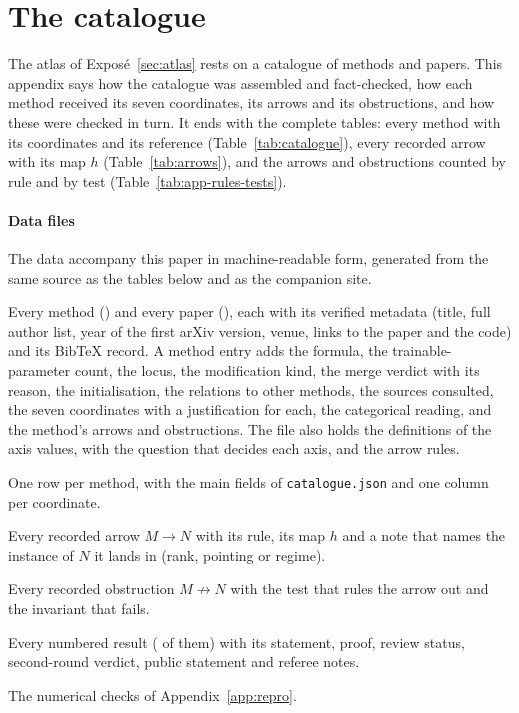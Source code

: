 \section{The catalogue}\label{app:catalogue}

The atlas of Exposé~\ref{sec:atlas} rests on a catalogue of \nMethods{} methods and \nPapers{} papers. This appendix
says how the catalogue was assembled and fact-checked, how each method received its seven coordinates, its arrows and
its obstructions, and how these were checked in turn. It ends with the complete tables: every method with its
coordinates and its reference (Table~\ref{tab:catalogue}), every recorded arrow with its map $h$
(Table~\ref{tab:arrows}), and the arrows and obstructions counted by rule and by test
(Table~\ref{tab:app-rules-tests}).

\paragraph{Data files} The data accompany this paper in machine-readable form, generated from the same source as the tables
below and as the companion site.
\begin{description}[leftmargin=1.2em,itemsep=2pt]
  \item[\texttt{catalogue.json}] Every method (\nMethods{}) and every paper (\nPapers{}), each with its verified
  metadata (title, full author list, year of the first arXiv version, venue, links to the paper and the code) and its
  BibTeX record. A method entry adds the formula, the trainable-parameter count, the locus, the modification kind, the
  merge verdict with its reason, the initialisation, the relations to other methods, the sources consulted, the seven
  coordinates with a justification for each, the categorical reading, and the method's arrows and obstructions. The
  file also holds the definitions of the axis values, with the question that decides each axis, and the arrow rules.
  \item[\texttt{catalogue.csv}] One row per method, with the main fields of \texttt{catalogue.json} and one column per
  coordinate.
  \item[\texttt{arrows.csv}] Every recorded arrow $M\to N$ with its rule, its map $h$ and a note that names the instance
  of $N$ it lands in (rank, pointing or regime).
  \item[\texttt{obstructions.csv}] Every recorded obstruction $M\not\to N$ with the test that rules the arrow out and
  the invariant that fails.
  \item[\texttt{propositions.json}] Every numbered result (\nPropositions{} of them) with its statement, proof, review
  status, second-round verdict, public statement and referee notes.
  \item[\texttt{framework\_checks.py}] The numerical checks of Appendix~\ref{app:repro}.
\end{description}

